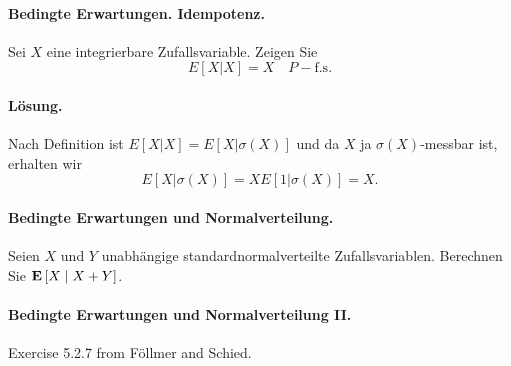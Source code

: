 \paragraph{Bedingte Erwartungen. Idempotenz. } Sei $X$ eine integrierbare Zufallsvariable. Zeigen Sie
\begin{equation}
	E\left[ X|X \right] = X \quad P-\textrm{f.s.}
\end{equation}

\paragraph*{Lösung. } 
Nach Definition ist $E\left[ X| X \right]=E\left[ X|\sigma\left( X \right) \right]$ und
da $X$ ja $\sigma\left( X \right)$-messbar ist, erhalten wir
\begin{equation}
	E\left[ X|\sigma\left( X \right) \right]= X E\left[ 1 | \sigma\left( X \right) \right] =X.
\end{equation}



\paragraph{Bedingte Erwartungen und Normalverteilung. } Seien $X$ und $Y$ unabhängige
standardnormalverteilte Zufallsvariablen. Berechnen Sie $\mathbf{E}\left[ X \;\middle\vert\; X+Y
\right]$.


\paragraph{Bedingte Erwartungen und Normalverteilung II. } Exercise 5.2.7 from Föllmer and Schied.



